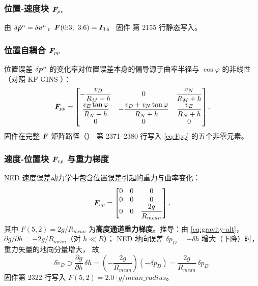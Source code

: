 \subsubsection{位置-速度块 $\boldsymbol{F}_{pv}$}

由 $\delta\dot{\boldsymbol{p}}^n = \delta\boldsymbol{v}^n$，$\boldsymbol{F}(0{:}3,\ 3{:}6) = \boldsymbol{I}_3$。
固件  第 2155 行静态写入。

\subsubsection{位置自耦合 $\boldsymbol{F}_{pp}$}

位置误差 $\delta\boldsymbol{p}^n$ 的变化率对位置误差本身的偏导源于曲率半径与
$\cos\varphi$ 的非线性（对照 KF-GINS \cite{Farrell2000}）：
\begin{equation}
  \boldsymbol{F}_{pp} =
  \begin{bmatrix}
    -\dfrac{v_D}{R_M+h} & 0 & \dfrac{v_N}{R_M+h} \\[1.2ex]
    \dfrac{v_E\tan\varphi}{R_N+h} & -\dfrac{v_D + v_N\tan\varphi}{R_N+h}
      & \dfrac{v_E}{R_N+h} \\[1.2ex]
    0 & 0 & 0
  \end{bmatrix}.
  \label{eq:Fpp}
\end{equation}
固件在完整 $\boldsymbol{F}$ 矩阵路径（）
第 2371--2380 行写入 \cref{eq:Fpp} 的五个非零元素。

\subsubsection{速度-位置块 $\boldsymbol{F}_{vp}$ 与重力梯度}

NED 速度误差动力学中包含位置误差引起的重力与曲率变化：
\begin{equation}
  \boldsymbol{F}_{vp} = \begin{bmatrix}
    0 & 0 & 0 \\ 0 & 0 & 0 \\ 0 & 0 & \dfrac{2g}{R_{mean}}
  \end{bmatrix},
  \label{eq:Fvp}
\end{equation}
其中 $F(5,2) = 2g/R_{mean}$ 为\textbf{高度通道重力梯度}。推导：由
\cref{eq:gravity-alt}，$\partial g/\partial h = -2g/R_{mean}$（对 $h\ll R$）；
NED 地向误差 $\delta p_D = -\delta h$ 增大（下降）时，重力矢量的地向分量增大，
故
\begin{equation}
  \delta\dot{v}_D \supset \frac{\partial g}{\partial h}\,\delta h
  = \left(-\frac{2g}{R_{mean}}\right)(-\delta p_D)
  = \frac{2g}{R_{mean}}\,\delta p_D.
  \label{eq:f52}
\end{equation}
固件第 2322 行写入 $F(5,2) = 2.0\cdot g / mean\_radius$。


